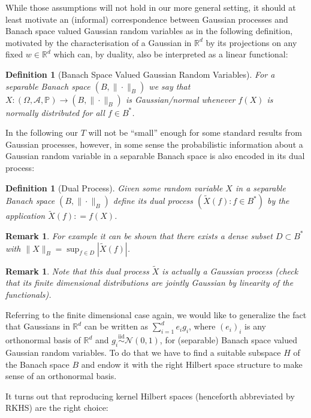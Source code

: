 \documentclass[11pt,reqno]{amsart}
\numberwithin{equation}{section}
\newtheorem{defi}[thm]{Definition}
\newtheorem{rem}[thm]{Remark}
\newcommand{\deq}{\mathrel{\mathop:}=}
\newcommand{\iidnormal}{\mathrel{\stackrel{\text{iid}}{\sim}}\mathcal N(0,1)}
\begin{document}
While those assumptions will not hold in our more general setting, it should at least motivate an (informal) correspondence between Gaussian processes and Banach space valued Gaussian random variables as in the following definition, motivated by the characterisation of a Gaussian in $\mathbb R^d$ by its projections on any fixed $w\in\mathbb R^d$ which can, by duality, also be interpreted as a linear functional:

\begin{defi}[Banach Space Valued Gaussian Random Variables]
	For a separable Banach space $(B,\|\cdot\|_B)$ we say that $X:(\Omega,\mathcal A,\mathbb P)\rightarrow(B,\|\cdot\|_B)$ is Gaussian/normal whenever $f(X)$ is normally distributed for all $f\in B^*$.
\end{defi}

In the following our $T$ will not be ``small'' enough for some standard results from Gaussian processes, however, in some sense the probabilistic information about a Gaussian random variable in a separable Banach space is also encoded in its dual process:

\begin{defi}[Dual Process]
	Given some random variable $X$ in a separable Banach space $(B,\|\cdot\|_B)$ define its dual process $(\tilde X(f): f\in B^*)$ by the application $\tilde X(f)\deq f(X)$.
\end{defi}

\begin{rem}
	For example it can be shown that there exists a dense subset $D\subset B^*$ with $\|X\|_B = \sup_{f\in D}|\tilde X(f)|$.
\end{rem}

\begin{rem}
	Note that this dual process $\tilde X$ is actually a Gaussian process (check that its finite dimensional distributions are \emph{jointly} Gaussian by linearity of the functionals).
\end{rem}

Referring to the finite dimensional case again, we would like to generalize the fact that Gaussians in $\mathbb R^d$ can be written as $\sum_{i=1}^d e_ig_i$, where $(e_i)_i$ is any orthonormal basis of $\mathbb R^d$ and $g_i\iidnormal$, for (separable) Banach space valued Gaussian random variables. To do that we have to find a suitable subspace $H$ of the Banach space $B$ and endow it with the right Hilbert space structure to make sense of an orthonormal basis.

It turns out that reproducing kernel Hilbert spaces (henceforth abbreviated by RKHS) are the right choice:
\end{document}
